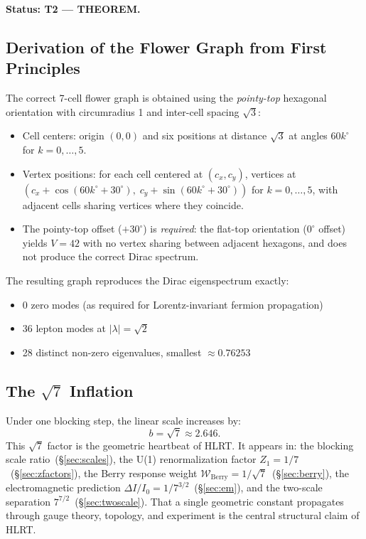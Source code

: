 \documentclass[11pt,letterpaper]{article}
\begin{document}
\textbf{Status: T2 --- THEOREM.}

\subsection{Derivation of the Flower Graph from First Principles}

The correct 7-cell flower graph is obtained using the \emph{pointy-top}
hexagonal orientation with circumradius 1 and inter-cell spacing $\sqrt{3}$:

\begin{itemize}[nosep]
  \item Cell centers: origin $(0,0)$ and six positions at distance $\sqrt{3}$
        at angles $60k^\circ$ for $k=0,\ldots,5$.
  \item Vertex positions: for each cell centered at $(c_x,c_y)$,
        vertices at $(c_x + \cos(60k^\circ + 30^\circ),\; c_y + \sin(60k^\circ+30^\circ))$
        for $k=0,\ldots,5$, with adjacent cells sharing vertices where they
        coincide.
  \item The pointy-top offset ($+30^\circ$) is \emph{required}: the flat-top
        orientation ($0^\circ$ offset) yields $V=42$ with no vertex sharing
        between adjacent hexagons, and does not produce the correct Dirac
        spectrum.
\end{itemize}

The resulting graph reproduces the Dirac eigenspectrum exactly:
\begin{itemize}[nosep]
  \item 0 zero modes (as required for Lorentz-invariant fermion propagation)
  \item 36 lepton modes at $|\lambda|=\sqrt{2}$
  \item 28 distinct non-zero eigenvalues, smallest $\approx 0.76253$
\end{itemize}

\subsection{The $\sqrt{7}$ Inflation}

Under one blocking step, the linear scale increases by:
\begin{equation}
  b = \sqrt{7} \approx 2.646.
\end{equation}
This $\sqrt{7}$ factor is the geometric heartbeat of HLRT.  It appears in:
the blocking scale ratio~(\S\ref{sec:scales}),
the U(1) renormalization factor $Z_1 = 1/7$~(\S\ref{sec:zfactors}),
the Berry response weight $\mathcal{W}_\mathrm{Berry}=1/\sqrt{7}$~(\S\ref{sec:berry}),
the electromagnetic prediction $\Delta I/I_0 = 1/7^{3/2}$~(\S\ref{sec:em}),
and the two-scale separation $7^{7/2}$~(\S\ref{sec:twoscale}).
That a single geometric constant propagates through gauge theory,
topology, and experiment is the central structural claim of HLRT.
\end{document}
